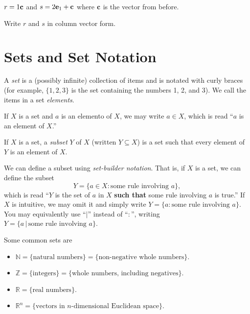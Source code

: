 \documentclass[14pt]{problemset}
\newcommand{\xh}{{{\mathbf e}_1}}
\newcommand{\R}{\mathbb{R}}
\newcommand{\Z}{\mathbb{Z}}
\newcommand{\N}{\mathbb{N}}
\begin{document}
	\question 
	$r=1\bf c$ and $s=2\xh+\bf c$ where $\bf c$ is the vector from before.
	\begin{parts}
		\item Write $r$ and $s$ in column vector form.
	\end{parts}

\section*{Sets and Set Notation}
\vspace{-.5cm}

	\begin{definition}[Set]
		A \emph{set} is a (possibly infinite) collection of items
		and is notated with curly braces (for example, $\{1,2,3\}$ is
		the set containing the numbers 1, 2, and 3).  We call the items in
		a set \emph{elements}.

		If $X$ is a set and $a$ is an elemento of $X$, we may write $a\in X$,
		which is read ``$a$ is an element of $X$.''

		If $X$ is a set, a \emph{subset} $Y$ of $X$ (written $Y\subseteq X$)
		is a set such that every element of $Y$ is an element of $X$.

		We can define a subset using \emph{set-builder notation}.
		That is, if $X$ is a set, we can define the subset 
		\[
			Y= \{a\in X:\text{some rule involving }a\},
		\]
		which is read ``$Y$ is the set of $a$ in $X$ {\bf such that} some rule
		involving $a$ is true.''  If $X$ is intuitive, we may omit it and
		simply write $Y=\{a:\text{some rule involving }a\}$.  You may equivalently
		use ``$|$'' instead of ``$:$'', writing $Y=\{a\,|\,\text{some rule involving }a\}$.
	\end{definition}

	\begin{definition}
		Some common sets are
		\begin{itemize}
			\item[] $\N=\{\text{natural numbers}\} = \{\text{non-negative whole numbers}\}$.
			\item[] $\Z=\{\text{integers}\} = \{\text{whole numbers, including negatives}\}$.
			\item[] $\R=\{\text{real numbers}\}$.
			\item[] $\R^n=\{\text{vectors in $n$-dimensional Euclidean space}\}$.
		\end{itemize}
	\end{definition}
\end{document}
